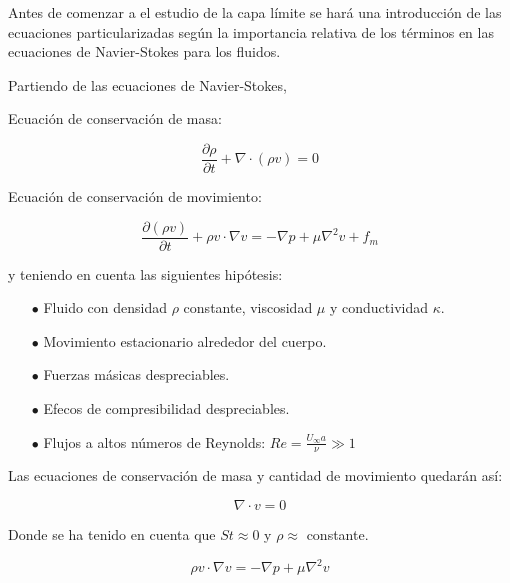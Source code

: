 \documentclass[11pt,a4paper]{article}
\begin{document}





Antes de comenzar a el estudio de la capa límite se hará una introducción de las ecuaciones particularizadas según la importancia relativa de los términos en las ecuaciones de Navier-Stokes para los fluidos.

\vspace{0.5cm}

Partiendo de las ecuaciones de Navier-Stokes,

\vspace{1cm}


Ecuación de conservación de masa:


\[\frac{\partial \rho}{\partial t} + \nabla \cdot (\rho v)=0\]

\vspace{0.5cm}
Ecuación de conservación de movimiento:


\[\frac{ \partial (\rho v) }{\partial{t}} + \rho v \cdot \nabla v = -\nabla p + \mu \nabla^{2} v + f_{m}\]

\vspace{0.5cm}

y teniendo en cuenta las siguientes hipótesis:
\vspace{1cm}

\begin{enumerate}[\hspace*{0.5cm}]
\item[$\bullet$] Fluido con densidad $\rho$ constante, viscosidad $\mu$  y conductividad $\kappa$.
\item[$\bullet$] Movimiento estacionario alrededor del cuerpo.
\item[$\bullet$] Fuerzas másicas despreciables.
\item[$\bullet$] Efecos de compresibilidad despreciables.
\item[$\bullet$] Flujos a altos números de Reynolds: $Re=\frac{U_{\infty} a}{\nu} \gg 1 $
\end{enumerate}

\vspace{1cm}


Las ecuaciones de conservación de masa y cantidad de movimiento quedarán así:


\[\nabla \cdot v=0\]


Donde se ha tenido en cuenta que $St\approx 0$ y $\rho \approx$ constante.


\[\rho v \cdot \nabla v = -\nabla p + \mu \nabla^{2} v \]
\end{document}
